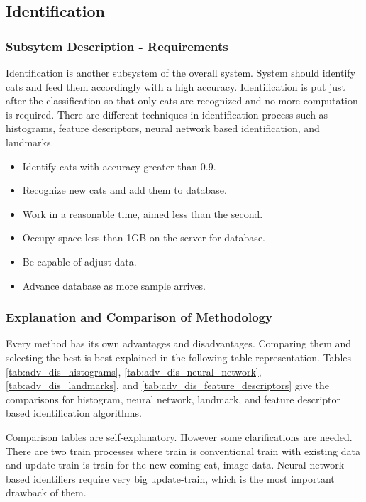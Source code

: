 \subsection{Identification}
\label{sec:identification}
\subsubsection{Subsytem Description - Requirements}
Identification is another subsystem of the overall system. System should identify cats and feed them accordingly with a high accuracy. Identification is put just after the classification so that only cats are recognized and no more computation is required. There are different techniques in identification process such as histograms, feature descriptors, neural network based identification, and landmarks.


\begin{itemize}
    \item Identify cats with accuracy greater than 0.9.
    \item Recognize new cats and add them to database.
    \item Work in a reasonable time, aimed less than the second.
    \item Occupy space less than 1GB on the server for database.
    \item Be capable of adjust data.
    \item Advance database as more sample arrives.
\end{itemize}


\subsubsection{Explanation and Comparison of Methodology}
Every method has its own advantages and disadvantages. Comparing them and selecting the best is best explained in the following table representation. Tables \ref{tab:adv_dis_histograms}, \ref{tab:adv_dis_neural_network}, \ref{tab:adv_dis_landmarks}, and \ref{tab:adv_dis_feature_descriptors} give the comparisons for histogram, neural network, landmark, and feature descriptor based identification algorithms.



Comparison tables are self-explanatory. However some clarifications are needed. There are two train processes where train is conventional train with existing data and update-train is train for the new coming cat, image data. Neural network based identifiers require very big update-train, which is the most important drawback of them. 

